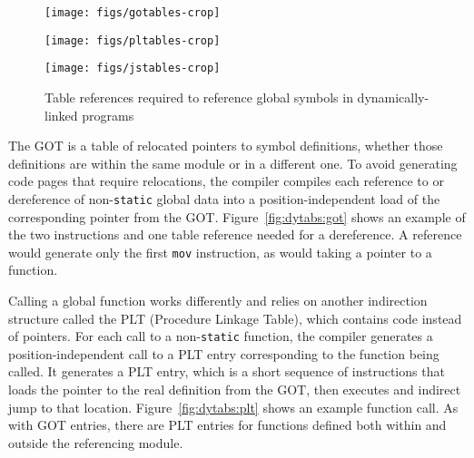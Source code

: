 \begin{figure*}
	\begin{minipage}{\textwidth}
	\texttt{[image: figs/gotables-crop]}
	\label{fig:dytabs:got}
	\end{minipage}

	\begin{minipage}{\textwidth}
	\texttt{[image: figs/pltables-crop]}
	\label{fig:dytabs:plt}
	\end{minipage}

	\begin{minipage}{\textwidth}
	\texttt{[image: figs/jstables-crop]}
	\label{fig:dytabs:lazy}
	\end{minipage}
\caption{Table references required to reference global symbols in dynamically-linked
programs}
\label{fig:dytabs}
\end{figure*}

The GOT is a table of relocated pointers to symbol definitions, whether those
definitions are within the same module or in a different one.  To avoid generating
code pages that require relocations, the compiler compiles each reference to or
dereference of non-\texttt{static} global data into a position-independent load of
the corresponding pointer from the GOT.  Figure~\ref{fig:dytabs:got} shows an example
of the two instructions and one table reference needed for a dereference.  A
reference would generate only the first \texttt{mov} instruction, as would taking a
pointer to a function.

Calling a global function works differently and relies on another indirection
structure called the PLT (Procedure Linkage Table), which contains code instead of
pointers.  For each call to a non-\texttt{static} function, the compiler generates a
position-independent call to a PLT entry corresponding to the function being called.
It generates a PLT entry, which is a short sequence of instructions that loads the
pointer to the real definition from the GOT, then executes and indirect jump to that
location.  Figure~\ref{fig:dytabs:plt} shows an example function call.  As with GOT
entries, there are PLT entries for functions defined both within and outside the
referencing module.

